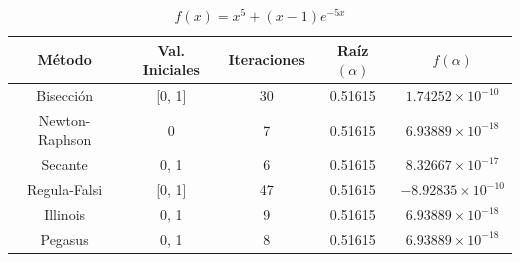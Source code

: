 \begin{table}[H]
\centering

\renewcommand{\arraystretch}{1.3} %
\setlength{\tabcolsep}{12pt}      %

\begin{tabular}{ccccc}
\hline
Método & Val. Iniciales & Iteraciones & Raíz $(\alpha)$ & $f(\alpha)$ \\
\hline

Bisección      & [0, 1] & 30 & 0.51615 & $1.74252\times10^{-10}$ \\

Newton-Raphson & 0      &  7 & 0.51615 & $6.93889\times10^{-18}$ \\

Secante        & 0, 1   &  6 & 0.51615 & $8.32667\times10^{-17}$ \\

Regula-Falsi   & [0, 1] & 47 & 0.51615 & $-8.92835\times10^{-10}$ \\

Illinois       & 0, 1   &  9 & 0.51615 & $6.93889\times10^{-18}$ \\

Pegasus        & 0, 1   &  8 & 0.51615 & $6.93889\times10^{-18}$ \\

\hline
\end{tabular}

\caption{$f(x) = x^{5} + \left(x - 1\right) e^{- 5 x}$}
\end{table}


